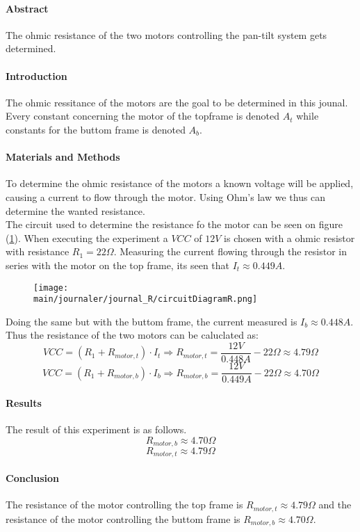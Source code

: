 \documentclass[../../main]{subfiles}
\begin{document}
\paragraph{Abstract}
The ohmic resistance of the two motors controlling the pan-tilt system gets determined.
\paragraph{Introduction}
The ohmic ressitance of the motors are the goal to be determined in this jounal. Every constant concerning the motor of the topframe is denoted $A_t$ while constants for the buttom frame is denoted $A_b$.
\paragraph{Materials and Methods}
To determine the ohmic resistance of the motors a known voltage will be applied, causing a current to flow through the motor. Using Ohm's law we thus can determine the wanted resistance.\\
The circuit used to determine the resistance fo the motor can be seen on figure (\ref{fig:resistance_circuit}). When executing the experiment a $VCC$ of $12V$ is chosen with a ohmic resistor with resistance $R_1 = 22\Omega$. Measuring the current flowing through the resistor in series with the motor on the top frame, its seen that $I_t \approx 0.449 A$.

\begin{figure}[H]
  \begin{center}
    \texttt{[image: \\main/journaler/journal\_R/circuitDiagramR.png]}
  \end{center}
  \label{fig:resistance_circuit}
\end{figure}
Doing the same but with the buttom frame, the current measured is $I_b \approx 0.448 A$. Thus the resistance of the two motors can be caluclated as:
$$VCC = (R_1 + R_{motor,t})\cdot I_t \Rightarrow R_{motor,t} = \frac{12V}{0.448 A}-22\Omega \approx 4.79 \Omega $$
$$VCC = (R_1 + R_{motor,b})\cdot I_b \Rightarrow R_{motor,b} = \frac{12V}{0.449 A}-22\Omega \approx 4.70 \Omega $$


\paragraph{Results}

The result of this experiment is as follows.
$$R_{motor,b} \approx 4.70 \Omega$$
$$R_{motor,t} \approx 4.79 \Omega$$

\paragraph{Conclusion}

The resistance of the motor controlling the top frame is $R_{motor,t}\approx 4.79 \Omega$ and the resistance of the motor controlling the buttom frame is $R_{motor,b}\approx 4.70 \Omega$.
\end{document}
